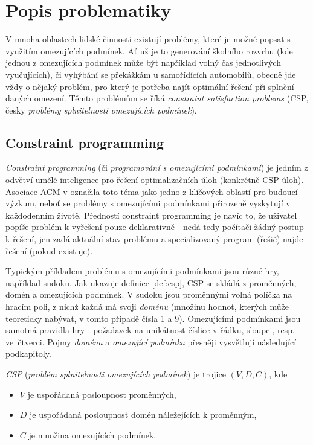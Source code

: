 \chapter{Popis problematiky}
V mnoha oblastech lidské činnosti existují problémy, které je možné popsat s využitím omezujících podmínek. Ať už je to generování školního rozvrhu (kde jednou z omezujících podmínek může být například volný čas jednotlivých vyučujících), či vyhýbání se překážkám u samořídících automobilů, obecně jde vždy o nějaký problém, pro který je potřeba najít optimální řešení při splnění daných omezení. Těmto problémům se říká \emph{constraint satisfaction problems} (CSP, česky \emph{problémy splnitelnosti omezujících podmínek}).






\section{Constraint programming}
\emph{Constraint programming} (či \emph{programování s omezujícími podmínkami}) je jedním z odvětví umělé inteligence pro řešení optimalizačních úloh (konkrétně CSP úloh). Asociace ACM v \cite{Wegner1996} označila toto téma jako jedno z klíčových oblastí pro budoucí výzkum, neboť se problémy s omezujícími podmínkami přirozeně vyskytují v každodenním životě. Předností constraint programming je navíc to, že uživatel popíše problém k vyřešení pouze deklarativně - nedá tedy počítači žádný postup k řešení, jen zadá aktuální stav problému a specializovaný program (řešič) najde řešení (pokud existuje).

Typickým příkladem problému s omezujícími podmínkami jsou různé hry, například sudoku. Jak ukazuje definice \ref{def:csp}, CSP se skládá z proměnných, domén a omezujících podmínek. V sudoku jsou proměnnými volná políčka na hracím poli, z nichž každá má svoji \emph{doménu} (množinu hodnot, kterých může teoreticky nabývat, v tomto případě čísla 1 a 9). Omezujícími podmínkami jsou samotná pravidla hry - požadavek na unikátnost číslice v řádku, sloupci, resp. ve~čtverci. Pojmy \emph{doména} a \emph{omezující podmínka} přesněji vysvětlují následující podkapitoly.

\begin{definition}
\label{def:csp}
\emph{CSP} (\emph{problém splnitelnosti omezujících podmínek}) je trojice $(V, D, C)$, kde
\begin{itemize}
  \item $V$ je uspořádaná posloupnost proměnných,
  \item $D$ je uspořádaná posloupnost domén náležejících k proměnným,
  \item $C$ je množina omezujících podmínek.
\end{itemize}
\end{definition}

